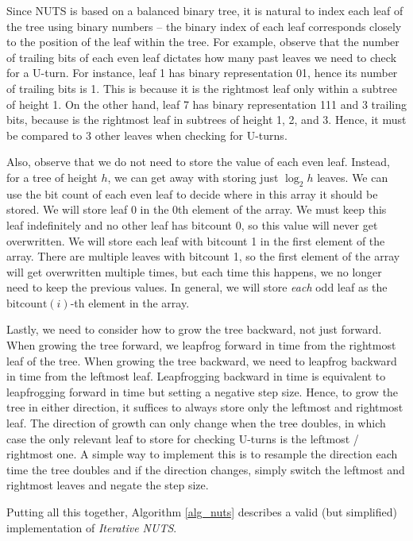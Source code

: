 \documentclass[12pt]{article}
\begin{document}
Since NUTS is based on a balanced binary tree, it is natural to index each leaf of the tree using binary numbers -- the binary index of each leaf corresponds closely to the position of the leaf within the tree. For example, observe that the number of trailing bits of each even leaf dictates how many past leaves we need to check for a U-turn. For instance, leaf 1 has binary representation 01, hence its number of trailing bits is 1. This is because it is the rightmost leaf only within a subtree of height 1. On the other hand, leaf 7 has binary representation 111 and 3 trailing bits, because is the rightmost leaf in subtrees of height 1, 2, and 3. Hence, it must be compared to 3 other leaves when checking for U-turns.

Also, observe that we do not need to store the value of each even leaf. Instead, for a tree of height $h$, we can get away with storing just $\log_2 h$ leaves. We can use the bit count of each even leaf to decide where in this array it should be stored. We will store leaf 0 in the 0th element of the array. We must keep this leaf indefinitely and no other leaf has bitcount 0, so this value will never get overwritten. We will store each leaf with bitcount 1 in the first element of the array. There are multiple leaves with bitcount 1, so the first element of the array will get overwritten multiple times, but each time this happens, we no longer need to keep the previous values. In general, we will store \textit{each} odd leaf as the $\text{bitcount}(i)$-th element in the array.

Lastly, we need to consider how to grow the tree backward, not just forward. When growing the tree forward, we leapfrog forward in time from the rightmost leaf of the tree. When growing the tree backward, we need to leapfrog backward in time from the leftmost leaf. Leapfrogging backward in time is equivalent to leapfrogging forward in time but setting a negative step size. Hence, to grow the tree in either direction, it suffices to always store only the leftmost and rightmost leaf. The direction of growth can only change when the tree doubles, in which case the only relevant leaf to store for checking U-turns is the leftmost / rightmost one. A simple way to implement this is to resample the direction each time the tree doubles and if the direction changes, simply switch the leftmost and rightmost leaves and negate the step size.

Putting all this together, Algorithm \ref{alg_nuts} describes a valid (but simplified) implementation of \textit{Iterative NUTS}.
\end{document}

